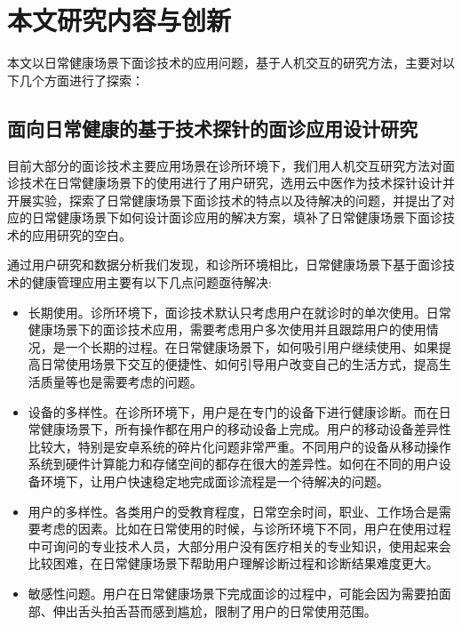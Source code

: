 
\section{本文研究内容与创新}

本文以日常健康场景下面诊技术的应用问题，基于人机交互的研究方法，主要对以下几个方面进行了探索：

\subsection{面向日常健康的基于技术探针的面诊应用设计研究}

目前大部分的面诊技术主要应用场景在诊所环境下，我们用人机交互研究方法对面诊技术在日常健康场景下的使用进行了用户研究，选用云中医作为技术探针设计并开展实验，探索了日常健康场景下面诊技术的特点以及待解决的问题，并提出了对应的日常健康场景下如何设计面诊应用的解决方案，填补了日常健康场景下面诊技术的应用研究的空白\cite{ding2019reading}。

通过用户研究和数据分析我们发现，和诊所环境相比，日常健康场景下基于面诊技术的健康管理应用主要有以下几点问题亟待解决: 

\begin{itemize}
    
    \item 长期使用。诊所环境下，面诊技术默认只考虑用户在就诊时的单次使用。日常健康场景下的面诊技术应用，需要考虑用户多次使用并且跟踪用户的使用情况，是一个长期的过程。在日常健康场景下，如何吸引用户继续使用、如果提高日常使用场景下交互的便捷性、如何引导用户改变自己的生活方式，提高生活质量等也是需要考虑的问题。

    \item 设备的多样性。在诊所环境下，用户是在专门的设备下进行健康诊断。而在日常健康场景下，所有操作都在用户的移动设备上完成。用户的移动设备差异性比较大，特别是安卓系统的碎片化问题非常严重。不同用户的设备从移动操作系统到硬件计算能力和存储空间的都存在很大的差异性。如何在不同的用户设备环境下，让用户快速稳定地完成面诊流程是一个待解决的问题。
    
    \item 用户的多样性。各类用户的受教育程度，日常空余时间，职业、工作场合是需要考虑的因素。比如在日常使用的时候，与诊所环境下不同，用户在使用过程中可询问的专业技术人员，大部分用户没有医疗相关的专业知识，使用起来会比较困难，在日常健康场景下帮助用户理解诊断过程和诊断结果难度更大。
    
    \item 敏感性问题。用户在日常健康场景下完成面诊的过程中，可能会因为需要拍面部、伸出舌头拍舌苔而感到尴尬，限制了用户的日常使用范围。

\end{itemize}

